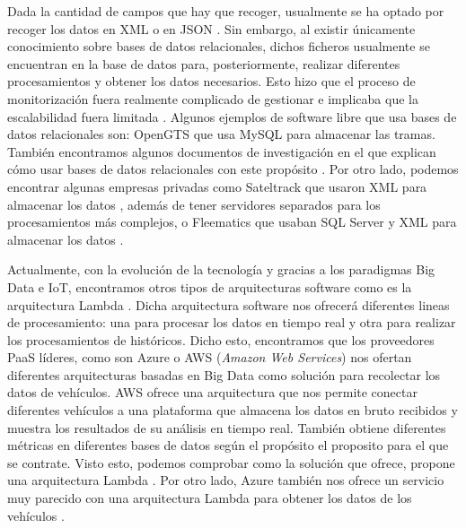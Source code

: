 Dada la cantidad de campos que hay que recoger, usualmente se ha optado por recoger los datos en XML o en JSON \cite{2-1}. Sin embargo, al existir únicamente conocimiento sobre bases de datos relacionales, dichos ficheros usualmente se encuentran en la base de datos para, posteriormente, realizar diferentes procesamientos y obtener los datos necesarios. Esto hizo que el proceso de monitorización fuera realmente complicado de gestionar e implicaba que la escalabilidad fuera limitada \cite{2-2}. Algunos ejemplos de software libre que usa bases de datos relacionales son: OpenGTS \cite{OpenGTS} que usa MySQL para almacenar las tramas. También encontramos algunos documentos de investigación en el que explican cómo usar bases de datos relacionales con este propósito \cite{2-4}. Por otro lado, podemos encontrar algunas empresas privadas como Sateltrack que usaron XML para almacenar los datos \cite{Sateltrack}, además de tener servidores separados para los procesamientos más complejos, o Fleematics que usaban SQL Server y XML para almacenar los datos \cite{fleematics}.\par

Actualmente, con la evolución de la tecnología y gracias a los paradigmas Big Data e IoT, encontramos otros tipos de arquitecturas software como es la arquitectura Lambda \cite{BD-2}\cite{Lambda}. Dicha arquitectura software nos ofrecerá diferentes lineas de procesamiento: una para procesar los datos en tiempo real y otra para realizar los procesamientos de históricos. Dicho esto, encontramos que los proveedores PaaS líderes, como son Azure o AWS (\emph{Amazon Web Services}) nos ofertan diferentes arquitecturas basadas en Big Data como solución para recolectar los datos de vehículos. AWS ofrece una arquitectura que nos permite conectar diferentes vehículos a una plataforma que almacena los datos en bruto recibidos y muestra los resultados de su análisis en tiempo real. También obtiene diferentes métricas en diferentes bases de datos según el propósito el proposito para el que se contrate. Visto esto, podemos comprobar como la solución que ofrece, propone una arquitectura Lambda \cite{AWS}. Por otro lado, Azure también nos ofrece un servicio muy parecido con una arquitectura Lambda para obtener los datos de los vehículos \cite{Azure}.\par


